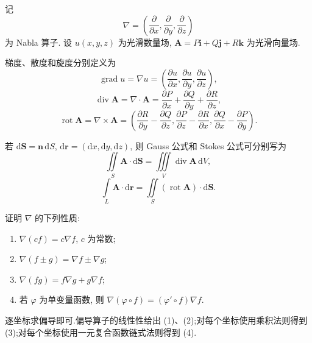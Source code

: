 记
\[
    \nabla=\left(\dfrac{\partial}{\partial x},\dfrac{\partial}{\partial y},\dfrac{\partial}{\partial z}\right)
\]
为 Nabla 算子. 设 $u(x,y,z)$ 为光滑数量场, $\bm A=P\bm i+Q\bm j+R\bm k$ 为光滑向量场.

\begin{definition}
    梯度、散度和旋度分别定义为
    \[
        \operatorname{grad}u=\nabla u
        =\left(\dfrac{\partial u}{\partial x},\dfrac{\partial u}{\partial y},\dfrac{\partial u}{\partial z}\right),
    \]
    \[
        \operatorname{div}\bm A=\nabla\cdot\bm A
        =\dfrac{\partial P}{\partial x}+\dfrac{\partial Q}{\partial y}+\dfrac{\partial R}{\partial z},
    \]
    \[
        \operatorname{rot}\bm A=\nabla\times\bm A
        =\left(
        \dfrac{\partial R}{\partial y}-\dfrac{\partial Q}{\partial z},
        \dfrac{\partial P}{\partial z}-\dfrac{\partial R}{\partial x},
        \dfrac{\partial Q}{\partial x}-\dfrac{\partial P}{\partial y}
        \right).
    \]
\end{definition}

\begin{remark}
    若 $\mathrm{d}\bm S=\bm n\,\mathrm{d}S$, $\mathrm{d}\bm r=(\mathrm{d}x,\mathrm{d}y,\mathrm{d}z)$, 则 Gauss 公式和 Stokes 公式可分别写为
    \[
        \iint\limits_S\bm A\cdot\mathrm{d}\bm S
        =\iiint\limits_V\operatorname{div}\bm A\,\mathrm{d}V,
    \]
    \[
        \int\limits_L\bm A\cdot\mathrm{d}\bm r
        =\iint\limits_S(\operatorname{rot}\bm A)\cdot\mathrm{d}\bm S.
    \]
\end{remark}

\begin{example}
    证明 $\nabla$ 的下列性质:
    \begin{enumerate}
        \item $\nabla(cf)=c\nabla f$, $c$ 为常数;
        \item $\nabla(f\pm g)=\nabla f\pm\nabla g$;
        \item $\nabla(fg)=f\nabla g+g\nabla f$;
        \item 若 $\varphi$ 为单变量函数, 则 $\nabla(\varphi\circ f)=(\varphi'\circ f)\nabla f$.
    \end{enumerate}
\end{example}
\exampleblank

\begin{solution}
    逐坐标求偏导即可.偏导算子的线性性给出 (1)、(2);对每个坐标使用乘积法则得到 (3);对每个坐标使用一元复合函数链式法则得到 (4).
\end{solution}

